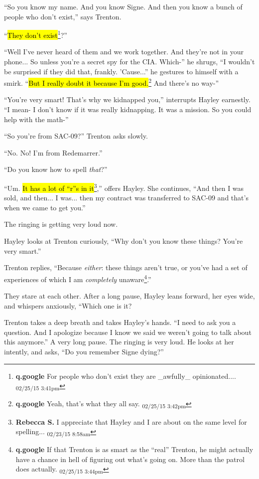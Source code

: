 ``So you know my name.  And you know Signe.  And then you know a bunch of people who don't exist,'' says Trenton.

``\hl{They don't exist}\footnote{\textbf{q.google }For people who don't exist they are \_awfully\_ opinionated.... \textsubscript{02/25/15 3:41pm}}?''

``Well I've never heard of them and we work together.  And they're not in your phone...  So unless you're a secret spy for the CIA.  Which-'' he shrugs, ``I wouldn't be surprised if they did that, frankly.  'Cause...'' he gestures to himself with a smirk.  ``\hl{But I really doubt it because I'm good.}\footnote{\textbf{q.google }Yeah, that's what they all say. \textsubscript{02/25/15 3:42pm}}  And there's no way-''

``You're very smart!  That's why we kidnapped you,'' interrupts Hayley earnestly.  ``I mean- I don't know if it was really kidnapping.  It was a mission.  So you could help with the math-''

``So you're from SAC-09?'' Trenton asks slowly.

``No.  No!  I'm from Redemarrer.'' 

``Do you know how to spell \textit{that}?''

``Um.  \hl{It has a lot of ``r''s in it}\footnote{\textbf{Rebecca S. }I appreciate that Hayley and I are about on the same level for spelling... \textsubscript{02/23/15 8:58am}},'' offers Hayley.  She continues, ``And then I was sold, and then... I was...  then my contract was transferred to SAC-09 and that's when we came to get you.''

The ringing is getting very loud now.

Hayley looks at Trenton curiously, ``Why don't you know these things?  You're very smart.''

Trenton replies, ``Because \textit{either}: these things aren't true, or you've had a set of experiences of which I am \textit{completely} unaware\footnote{\textbf{q.google }If that Trenton is as smart as the ``real'' Trenton, he might actually have a chance in hell of figuring out what's going on. More than the patrol does actually. \textsubscript{02/25/15 3:44pm}}.''

They stare at each other.  After a long pause, Hayley leans forward, her eyes wide, and whispers anxiously, ``Which one is it?

Trenton takes a deep breath and takes Hayley's hands.  ``I need to ask you a question.  And I apologize because I know we said we weren't going to talk about this anymore.''  A very long pause.  The ringing is very loud.  He looks at her intently, and asks, ``Do you remember Signe dying?''



